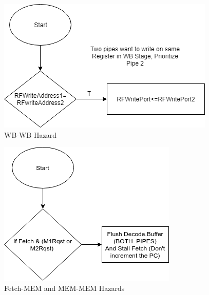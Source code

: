\documentclass[12pt]{article}
\theoremstyle{plain}
\theoremstyle{definition}
\begin{document}
\begin{figure}
    \centering
    \includegraphics[width=0.4\textheight]{Diagrams/WawDataDependency_Structural.png}
    \caption{WB-WB Hazard}
    \label{wbwb-chart}
\end{figure}

\begin{figure}
    \centering
    \includegraphics[height=0.3\textheight,keepaspectratio]{Diagrams/FetchMem.png}
    \caption{Fetch-MEM and MEM-MEM Hazards}
    \label{mem-chart}
\end{figure}
\end{document}
